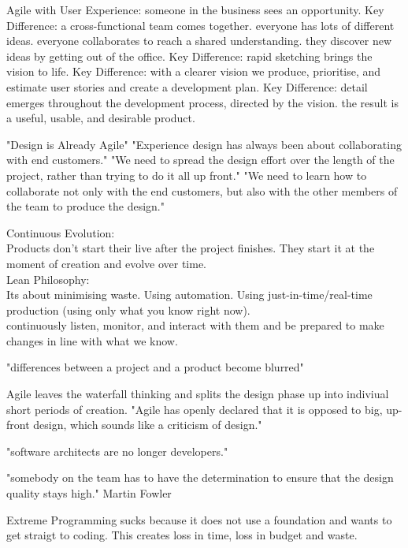 Agile with User Experience:
someone in the business sees an opportunity.
Key Difference: a cross-functional team comes together.
everyone has lots of different ideas.
everyone collaborates to reach a shared understanding.
they discover new ideas by getting out of the office.
Key Difference: rapid sketching brings the vision to life.
Key Difference: with a clearer vision we produce, prioritise, and estimate user stories and create a development plan.
Key Difference: detail emerges throughout the development process, directed by the vision.
the result is a useful, usable, and desirable product.
\citep{ratcliffe2011agile:34-35}

"Design is Already Agile" 
"Experience design has always been about collaborating with end customers." 
"We need to spread the design effort over the length of the project, rather than trying to do it all up front."
"We need to learn how to collaborate not only with the end customers, but also with the other members of the team to produce the design."
\citep{ratcliffe2011agile:36}

Continuous Evolution:\\
Products don't start their live after the project finishes.
They start it at the moment of creation and evolve over time.\\
Lean Philosophy:\\
Its about minimising waste. Using automation. Using just-in-time/real-time production (using only what you know right now).\\
continuously listen, monitor, and interact with them and be prepared to make changes in line with what we know.
\citep{ratcliffe2011agile:37}

"differences between a project and a product become blurred" \citep{ratcliffe2011agile:38}

Agile leaves the waterfall thinking and splits the design phase up into indiviual short periods of creation.
"Agile has openly declared that it is opposed to big, up-front design, which sounds like a criticism of design." 
\citep{ratcliffe2011agile:43}

"software architects are no longer developers." \citep{ratcliffe2011agile:44}

"somebody on the team has to have the determination to ensure that the design quality stays high." Martin Fowler \citep{ratcliffe2011agile:45}

Extreme Programming sucks because it does not use a foundation and wants to get straigt to coding. This creates loss in time, loss in budget and waste.


